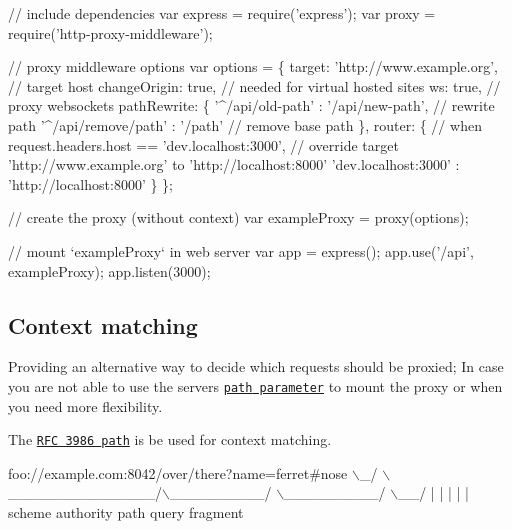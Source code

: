 \begin{DoxyCode}
// include dependencies
var express = require('express');
var proxy = require('http-proxy-middleware');

// proxy middleware options
var options = \{
        target: 'http://www.example.org', // target host
        changeOrigin: true,               // needed for virtual hosted sites
        ws: true,                         // proxy websockets
        pathRewrite: \{
            '^/api/old-path' : '/api/new-path',     // rewrite path
            '^/api/remove/path' : '/path'           // remove base path
        \},
        router: \{
            // when request.headers.host == 'dev.localhost:3000',
            // override target 'http://www.example.org' to 'http://localhost:8000'
            'dev.localhost:3000' : 'http://localhost:8000'
        \}
    \};

// create the proxy (without context)
var exampleProxy = proxy(options);

// mount `exampleProxy` in web server
var app = express();
    app.use('/api', exampleProxy);
    app.listen(3000);
\end{DoxyCode}


\subsection*{Context matching}

Providing an alternative way to decide which requests should be proxied; In case you are not able to use the server\textquotesingle{}s \href{http://expressjs.com/en/4x/api.html#app.use}{\tt {\ttfamily path} parameter} to mount the proxy or when you need more flexibility.

The \href{https://tools.ietf.org/html/rfc3986#section-3.3}{\tt R\+FC 3986 {\ttfamily path}} is be used for context matching.


\begin{DoxyCode}
  foo://example.com:8042/over/there?name=ferret#nose
  \(\backslash\)\_/   \(\backslash\)\_\_\_\_\_\_\_\_\_\_\_\_\_\_/\(\backslash\)\_\_\_\_\_\_\_\_\_/ \(\backslash\)\_\_\_\_\_\_\_\_\_/ \(\backslash\)\_\_/
   |           |            |            |        |
scheme     authority       path        query   fragment
\end{DoxyCode}



